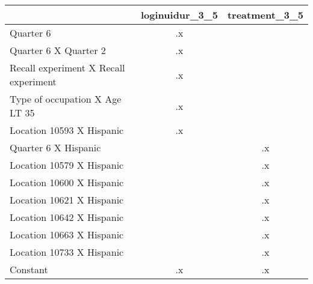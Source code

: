 \begin{tabular}{l*{2}{c}}
\hline\hline
                    &loginuidur\_3\_5&treatment\_3\_5\\
\hline
Quarter 6           &          .x&            \\
Quarter 6 X Quarter 2&          .x&            \\
Recall experiment X Recall experiment&          .x&            \\
Type of occupation X Age LT 35&          .x&            \\
Location 10593 X Hispanic&          .x&            \\
Quarter 6 X Hispanic&            &          .x\\
Location 10579 X Hispanic&            &          .x\\
Location 10600 X Hispanic&            &          .x\\
Location 10621 X Hispanic&            &          .x\\
Location 10642 X Hispanic&            &          .x\\
Location 10663 X Hispanic&            &          .x\\
Location 10733 X Hispanic&            &          .x\\
Constant            &          .x&          .x\\
\hline\hline
\end{tabular}
